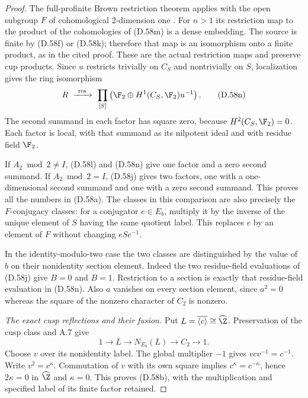 \begin{proof}
The full-profinite Brown restriction theorem applies
with the open subgroup $F$ of cohomological
$2$-dimension one
\cite[Theorem~2 and \S1.1]{A-KochloukovaZalesskii2007}.
For $n>1$ its restriction map to the product of the
cohomologies of (D.58m) is a dense embedding.
The source is finite by (D.58f) or (D.58k);
therefore that map is an isomorphism onto a finite
product, as in the cited proof.
These are the actual restriction maps and preserve
cup products. Since $u$ restricts trivially on
$C_S$ and nontrivially on $S$, localization gives
the ring isomorphism
\[
 R\ \xrightarrow{\ \operatorname{res}\ }\
   \prod_{[S]}
      \left(\F_2\oplus H^1(C_S,\F_2)u^{-1}\right).
                                                        \tag{D.58n}
\]
The second summand in each factor has square zero,
because $H^2(C_S,\F_2)=0$.
Each factor is local, with that summand as its
nilpotent ideal and with residue field $\F_2$.

If $A_2\bmod2\ne I$, (D.58l) and (D.58n) give
one factor and a zero second summand.
If $A_2\bmod2=I$, (D.58j) gives two factors,
one with a one-dimensional second summand and one
with a zero second summand.
This proves all the numbers in (D.58a).
The classes in this comparison are also precisely
the $F$-conjugacy classes:
for a conjugator $e\in E_b$, multiply it by the
inverse of the unique element of $S$ having the
same quotient label. This replaces $e$ by an
element of $F$ without changing $eSe^{-1}$.

In the identity-modulo-two case the two classes
are distinguished by the value of $b$ on their
nonidentity section element.
Indeed the two residue-field evaluations of
(D.58j) give $B=0$ and $B=1$.
Restriction to a section is exactly that
residue-field evaluation in (D.58n).
Also $a$ vanishes on every section element, since
$a^2=0$ whereas the square of the nonzero
character of $C_2$ is nonzero.

\emph{The exact cusp reflections and their fusion.}
Put $L=\overline{\langle c\rangle}\cong\widehat\Z$.
Preservation of the cusp class and A.7 give
\[
       1\longrightarrow L\longrightarrow N_{E_b}(L)
                     \longrightarrow C_2\longrightarrow1.
                                                        \tag{D.58o}
\]
Choose $v$ over its nonidentity label.
The global multiplier $-1$ gives $vcv^{-1}=c^{-1}$.
Write $v^2=c^\kappa$.
Commutation of $v$ with its own square implies
$c^\kappa=c^{-\kappa}$, hence $2\kappa=0$ in
$\widehat\Z$ and $\kappa=0$.
This proves (D.58b), with the multiplication and
specified label of its finite factor retained.


\end{proof}
